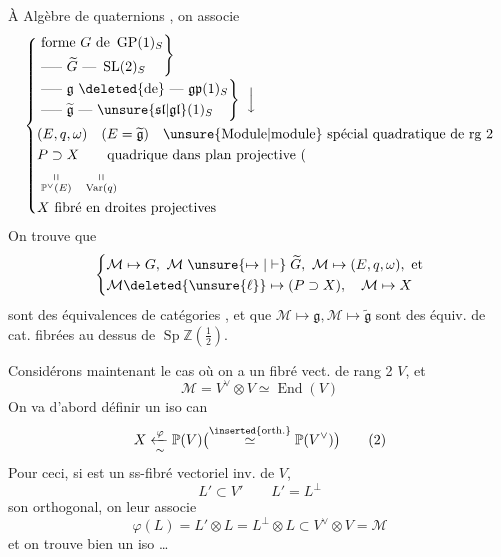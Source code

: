 À Algèbre de quaternions , on associe
\[
\left\{\begin{aligned}
 &\left.\begin{aligned}
 &\text{forme }G\text{ de }\operatorname{GP}(1)_S\\
 &\text{----- }\widetilde G\text{ --- }\operatorname{SL}(2)_S
 \end{aligned}\right\}\\[-2pt]
 &\left.\begin{aligned}
 &\text{----- }\mathfrak g\ \deleted{\text{de}}\text{ --- }\mathfrak{gp}(1)_S\\
 &\text{----- }\widetilde{\mathfrak g}\text{ --- }\unsure{\mathfrak{sl}|\mathfrak{gl}}(1)_S
 \end{aligned}\right\}\ \Big\downarrow\\
 &(E,q,\omega)\quad(E=\widetilde{\mathfrak g})\quad
 \text{\unsure{Module|module} spécial quadratique de rg 2}\\
 &P\supset X\qquad\text{quadrique dans plan projective (}\\
 &\underset{\mathbb P^\vee(E)}{\shortparallel}\quad
 \underset{\operatorname{Var}(q)}{\shortparallel}\\
 &X\text{ fibré en droites projectives}
\end{aligned}\right.
\]
On trouve que
\[
 \left\{\begin{aligned}
 &\mathcal M\mapsto G,\ \mathcal M\mathrel{\unsure{\mapsto|\vdash}}\widetilde G,\
 \mathcal M\mapsto(E,q,\omega),\ \text{et}\\
 &\mathcal M\deleted{\unsure{\ell}}\mapsto(P\supset X),\quad\mathcal M\mapsto X
 \end{aligned}\right.
\]
sont des équivalences de catégories , et que $\mathcal M\mapsto\mathfrak g,\mathcal M\mapsto\widetilde{\mathfrak g}$ sont des équiv. de cat. fibrées au dessus de $\operatorname{Sp}\mathbb Z(\tfrac12)$.

Considérons maintenant le cas où on a un fibré vect. de rang 2 $V$, et 
\[
 \mathcal M=V^\vee\otimes V\simeq\operatorname{End}(V)\tag*{(1)}
\]
On va d'abord définir un iso can
\[
 X\xleftarrow[\sim]{\varphi}\mathbb P(V)
 \bigl(\overset{\inserted{\text{orth.}}}{\simeq}\mathbb P(V^\vee)\bigr)\tag*{(2)}
\]
Pour ceci, si  est un ss-fibré vectoriel inv. de $V$, 
\[
 L'\subset V'\qquad L'=L^\perp
\]
son orthogonal, on leur associe
\[
 \varphi(L)=L'\otimes L=L^\perp\otimes L\subset V^\vee\otimes V=\mathcal M\tag*{(3)}
\]
et on trouve bien un iso \ldots
